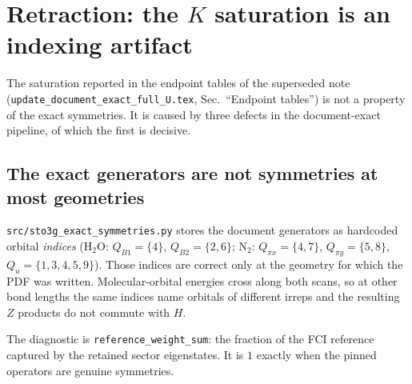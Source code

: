%

\section{Retraction: the $K$ saturation is an indexing artifact}
\label{sec:claims}

The saturation reported in the endpoint tables of the superseded note
(\texttt{update\_document\_exact\_full\_U.tex}, Sec.~``Endpoint tables'') is not a
property of the exact symmetries. It is caused by three defects in the
document-exact pipeline, of which the first is decisive.

\subsection{The exact generators are not symmetries at most geometries}

\texttt{src/sto3g\_exact\_symmetries.py} stores the document generators as
hardcoded orbital \emph{indices}
($\mathrm{H_2O}$: $Q_{B1}=\{4\}$, $Q_{B2}=\{2,6\}$;
$\mathrm{N_2}$: $Q_{\pi x}=\{4,7\}$, $Q_{\pi y}=\{5,8\}$,
$Q_u=\{1,3,4,5,9\}$).
Those indices are correct only at the geometry for which the PDF was written.
Molecular-orbital energies cross along both scans, so at other bond lengths the
same indices name orbitals of different irreps and the resulting $Z$ products
do not commute with $H$.

The diagnostic is \texttt{reference\_weight\_sum}: the fraction of the FCI
reference captured by the retained sector eigenstates. It is $1$ exactly when
the pinned operators are genuine symmetries.

